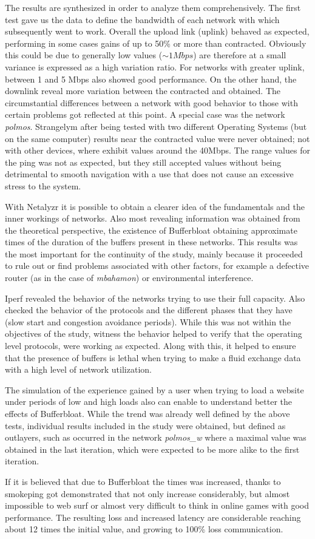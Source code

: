 The results are synthesized in order to analyze them comprehensively. 
The first test gave us the data to define the bandwidth of each
network with which subsequently went to work. Overall the upload link (uplink)
behaved as expected, performing in some cases gains of up to 50\% or more than
contracted. Obviously this could be due to generally low values ($\sim1Mbps$)
are therefore at a small variance is expressed as a high variation ratio. For
networks with greater uplink, between 1 and 5 Mbps also showed good
performance. On the other hand, the downlink reveal more variation between the
contracted and obtained. The circumstantial differences between a network with
good behavior to those with certain problems got reflected at this point. A
special case was the network \textit{polmos}. Strangelym after being tested with two
different Operating Systems (but on the same computer) results near
the contracted value were never obtained; not with other devices, where exhibit
values around the 40Mbps. The range values for the ping was not as expected,
but they still accepted values without being detrimental to smooth navigation
with a use that does not cause an excessive stress to the system.

With Netalyzr it is possible to obtain a clearer idea of the fundamentals and the
inner workings of networks. Also most revealing information was obtained from
the theoretical perspective, the existence of Bufferbloat obtaining
approximate times of the duration of the buffers present in these networks.
This results was the most important for the continuity of the study, mainly
because it proceeded to rule out or find problems associated with other
factors, for example a defective router (as in the case of \textit{mbahamon})
or environmental interference.

Iperf revealed the behavior of the networks trying to use their full
capacity. Also checked the behavior of the protocols and the different phases
that they have (slow start and congestion avoidance periods). While this was
not within the objectives of the study, witness the behavior helped to verify
that the operating level protocols, were working as expected. Along with this,
it helped to ensure that the presence of buffers is lethal when trying to make
a fluid exchange data with a high level of network utilization.

The simulation of the experience gained by a user when trying to load a
website under periods of low and high loads also can enable to understand
better the effects of Bufferbloat. While the trend was already well defined by
the above tests, individual results included in the study were obtained, but
defined as outlayers, such as occurred in the network \textit{polmos\_w} where
a maximal value was obtained in the last iteration, which were expected  to be
more alike to the first iteration.

If it is believed that due to Bufferbloat the times was increased, thanks to
smokeping got demonstrated that not only increase considerably, but almost
impossible to web surf or almost very difficult to think in online games with
good performance. The resulting loss and increased latency are considerable
reaching about 12 times the initial value, and growing to 100\% loss
communication.

